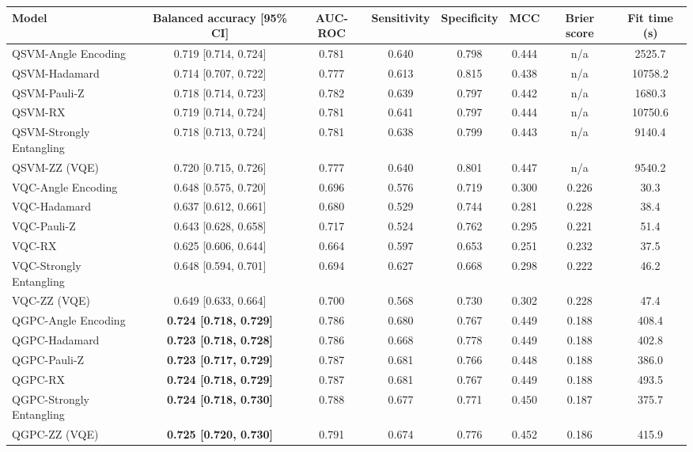 \begin{tabular}{lccccccc}
\toprule
Model & Balanced accuracy [95\% CI] & AUC-ROC & Sensitivity & Specificity & MCC & Brier score & Fit time (s) \\
\midrule
QSVM-Angle Encoding & 0.719 [0.714, 0.724] & 0.781 & 0.640 & 0.798 & 0.444 & n/a & 2525.7 \\
QSVM-Hadamard & 0.714 [0.707, 0.722] & 0.777 & 0.613 & 0.815 & 0.438 & n/a & 10758.2 \\
QSVM-Pauli-Z & 0.718 [0.714, 0.723] & 0.782 & 0.639 & 0.797 & 0.442 & n/a & 1680.3 \\
QSVM-RX & 0.719 [0.714, 0.724] & 0.781 & 0.641 & 0.797 & 0.444 & n/a & 10750.6 \\
QSVM-Strongly Entangling & 0.718 [0.713, 0.724] & 0.781 & 0.638 & 0.799 & 0.443 & n/a & 9140.4 \\
QSVM-ZZ (VQE) & 0.720 [0.715, 0.726] & 0.777 & 0.640 & 0.801 & 0.447 & n/a & 9540.2 \\
\midrule
VQC-Angle Encoding & 0.648 [0.575, 0.720] & 0.696 & 0.576 & 0.719 & 0.300 & 0.226 & 30.3 \\
VQC-Hadamard & 0.637 [0.612, 0.661] & 0.680 & 0.529 & 0.744 & 0.281 & 0.228 & 38.4 \\
VQC-Pauli-Z & 0.643 [0.628, 0.658] & 0.717 & 0.524 & 0.762 & 0.295 & 0.221 & 51.4 \\
VQC-RX & 0.625 [0.606, 0.644] & 0.664 & 0.597 & 0.653 & 0.251 & 0.232 & 37.5 \\
VQC-Strongly Entangling & 0.648 [0.594, 0.701] & 0.694 & 0.627 & 0.668 & 0.298 & 0.222 & 46.2 \\
VQC-ZZ (VQE) & 0.649 [0.633, 0.664] & 0.700 & 0.568 & 0.730 & 0.302 & 0.228 & 47.4 \\
\midrule
QGPC-Angle Encoding & \textbf{0.724 [0.718, 0.729]} & 0.786 & 0.680 & 0.767 & 0.449 & 0.188 & 408.4 \\
QGPC-Hadamard & \textbf{0.723 [0.718, 0.728]} & 0.786 & 0.668 & 0.778 & 0.449 & 0.188 & 402.8 \\
QGPC-Pauli-Z & \textbf{0.723 [0.717, 0.729]} & 0.787 & 0.681 & 0.766 & 0.448 & 0.188 & 386.0 \\
QGPC-RX & \textbf{0.724 [0.718, 0.729]} & 0.787 & 0.681 & 0.767 & 0.449 & 0.188 & 493.5 \\
QGPC-Strongly Entangling & \textbf{0.724 [0.718, 0.730]} & 0.788 & 0.677 & 0.771 & 0.450 & 0.187 & 375.7 \\
QGPC-ZZ (VQE) & \textbf{0.725 [0.720, 0.730]} & 0.791 & 0.674 & 0.776 & 0.452 & 0.186 & 415.9 \\

\end{tabular}
